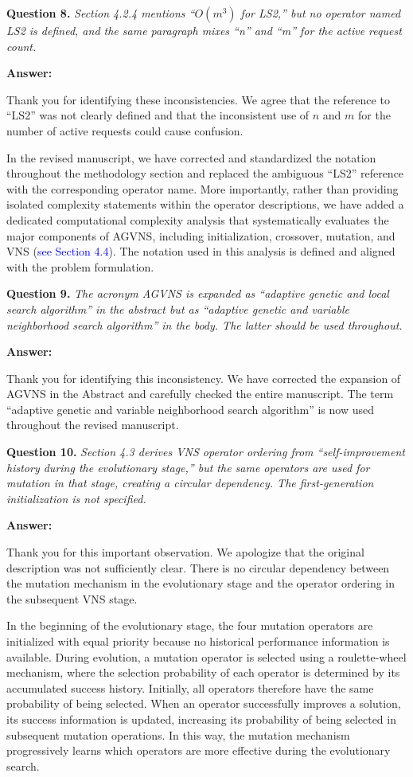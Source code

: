 \documentclass[11pt]{article}
\newcommand{\question}[2]{\vspace{0.5em}\noindent\textbf{Question #1.} \emph{#2}\par}
\newcommand{\answer}{\noindent\textbf{Answer:}\par}
\begin{document}
\question{8}{Section 4.2.4 mentions ``$O(m^3)$ for LS2,'' but no operator named LS2 is defined, and the same paragraph mixes ``n'' and ``m'' for the active request count.}
\answer
Thank you for identifying these inconsistencies. We agree that the reference to ``LS2'' was not clearly defined and that the inconsistent use of $n$ and $m$ for the number of active requests could cause confusion.

In the revised manuscript, we have corrected and standardized the notation throughout the methodology section and replaced the ambiguous ``LS2'' reference with the corresponding operator name. More importantly, rather than providing isolated complexity statements within the operator descriptions, we have added a dedicated computational complexity analysis that systematically evaluates the major components of AGVNS, including initialization, crossover, mutation, and VNS (\textcolor{blue}{see Section 4.4}). The notation used in this analysis is defined and aligned with the problem formulation.

\question{9}{The acronym AGVNS is expanded as ``adaptive genetic and local search algorithm'' in the abstract but as ``adaptive genetic and variable neighborhood search algorithm'' in the body. The latter should be used throughout.}
\answer Thank you for identifying this inconsistency. We have corrected the expansion of AGVNS in the Abstract and carefully checked the entire manuscript. The term ``adaptive genetic and variable neighborhood search algorithm'' is now used throughout the revised manuscript.

\question{10}{Section 4.3 derives VNS operator ordering from ``self-improvement history during the evolutionary stage,'' but the same operators are used for mutation in that stage, creating a circular dependency. The first-generation initialization is not specified.}

\answer
Thank you for this important observation. We apologize that the original description was not sufficiently clear. There is no circular dependency between the mutation mechanism in the evolutionary stage and the operator ordering in the subsequent VNS stage.

In the beginning of the evolutionary stage, the four mutation operators are initialized with equal priority because no historical performance information is available. During evolution, a mutation operator is selected using a roulette-wheel mechanism, where the selection probability of each operator is determined by its accumulated success history. Initially, all operators therefore have the same probability of being selected. When an operator successfully improves a solution, its success information is updated, increasing its probability of being selected in subsequent mutation operations. In this way, the mutation mechanism progressively learns which operators are more effective during the evolutionary search.
\end{document}
